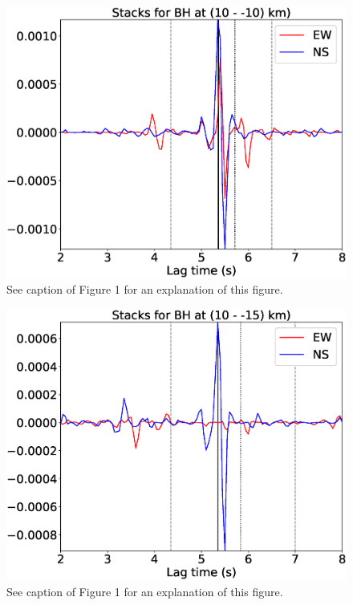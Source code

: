 \documentclass[letterpaper, 12pt]{article}
\begin{document}
\begin{figure}[H]
\includegraphics[width=\linewidth]{figures/intervals/BH_010_-10_stacks.eps}
\caption{See caption of Figure 1 for an explanation of this figure.}
\end{figure}

\begin{figure}[H]
\includegraphics[width=\linewidth]{figures/intervals/BH_010_-15_stacks.eps}
\caption{See caption of Figure 1 for an explanation of this figure.}
\end{figure}
\end{document}
